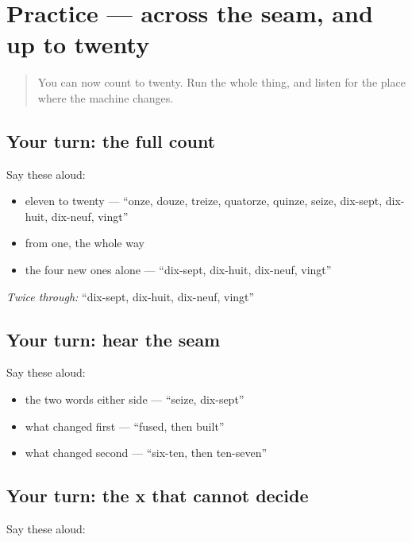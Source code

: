 \section[Practice]{Practice — across the seam, and up to twenty}

\label{lesson:FR-C12-practice-seam}



\begin{quote}
You can now count to twenty. Run the whole thing, and listen for the place where the machine changes.
\end{quote}

\subsection*{Your turn: the full count}
Say these aloud:

\begin{itemize}
\raggedright
  \item eleven to twenty — \textquotedblleft{}onze, douze, treize, quatorze, quinze, seize, dix-sept, dix-huit, dix-neuf, vingt\textquotedblright{}
  \item from one, the whole way
  \item the four new ones alone — \textquotedblleft{}dix-sept, dix-huit, dix-neuf, vingt\textquotedblright{}
\end{itemize}

\emph{Twice through:} \textquotedblleft{}dix-sept, dix-huit, dix-neuf, vingt\textquotedblright{}

\subsection*{Your turn: hear the seam}
Say these aloud:

\begin{itemize}
\raggedright
  \item the two words either side — \textquotedblleft{}seize, dix-sept\textquotedblright{}
  \item what changed first — \textquotedblleft{}fused, then built\textquotedblright{}
  \item what changed second — \textquotedblleft{}six-ten, then ten-seven\textquotedblright{}
\end{itemize}

\subsection*{Your turn: the x that cannot decide}
Say these aloud:

